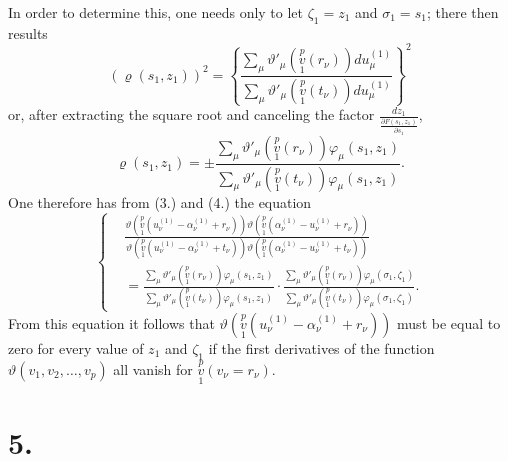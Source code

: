 \documentclass{article}
\begin{document}
In order to determine this, one needs only to let $\zeta_1 = z_1$ and $\sigma_1 = s_1$; there then results
\[
(\varrho(s_1, z_1))^2 = \left\{\frac{\sum_\mu \vartheta'_\mu\left(\overset{p}{\underset{1}{v}}(r_\nu)\right) du_\mu^{(1)}}{\sum_\mu \vartheta'_\mu\left(\overset{p}{\underset{1}{v}}(t_\nu)\right) du_\mu^{(1)}}\right\}^2
\]
or, after extracting the square root and canceling the factor $\displaystyle\frac{dz_1}{\displaystyle\frac{\partial F(s_1, z_1)}{\partial s_1}}$,
\[
\tag{(4.)}
\varrho(s_1, z_1) = \pm \frac{\sum_\mu \vartheta'_\mu\left(\overset{p}{\underset{1}{v}}(r_\nu)\right) \varphi_\mu(s_1, z_1)}{\sum_\mu \vartheta'_\mu\left(\overset{p}{\underset{1}{v}}(t_\nu)\right) \varphi_\mu(s_1, z_1)}.
\]
One therefore has from (3.) and (4.) the equation
\[
\tag{(5.)}
\left\{
\begin{aligned}
& \frac{\vartheta\left(\overset{p}{\underset{1}{v}}(u_\nu^{(1)} - \alpha_\nu^{(1)} + r_\nu)\right)\vartheta\left(\overset{p}{\underset{1}{v}}(\alpha_\nu^{(1)} - u_\nu^{(1)} + r_\nu)\right)}{\vartheta\left(\overset{p}{\underset{1}{v}}(u_\nu^{(1)} - \alpha_\nu^{(1)} + t_\nu)\right)\vartheta\left(\overset{p}{\underset{1}{v}}(\alpha_\nu^{(1)} - u_\nu^{(1)} + t_\nu)\right)} \\
&= \frac{\sum_\mu \vartheta'_\mu\left(\overset{p}{\underset{1}{v}}(r_\nu)\right) \varphi_\mu(s_1, z_1)}{\sum_\mu \vartheta'_\mu\left(\overset{p}{\underset{1}{v}}(t_\nu)\right) \varphi_\mu(s_1, z_1)} \cdot \frac{\sum_\mu \vartheta'_\mu\left(\overset{p}{\underset{1}{v}}(r_\nu)\right) \varphi_\mu(\sigma_1, \zeta_1)}{\sum_\mu \vartheta'_\mu\left(\overset{p}{\underset{1}{v}}(t_\nu)\right) \varphi_\mu(\sigma_1, \zeta_1)}.
\end{aligned}
\right.
\]
From this equation it follows that $\vartheta\left(\overset{p}{\underset{1}{v}}(u_\nu^{(1)} - \alpha_\nu^{(1)} + r_\nu)\right)$ must be equal to zero for every value
of $z_1$ and $\zeta_1$ if the first derivatives of the function $\vartheta(v_1, v_2, \dots, v_p)$ all vanish for $\overset{p}{\underset{1}{v}}(v_\nu = r_\nu)$.

\section*{5.}
\end{document}
